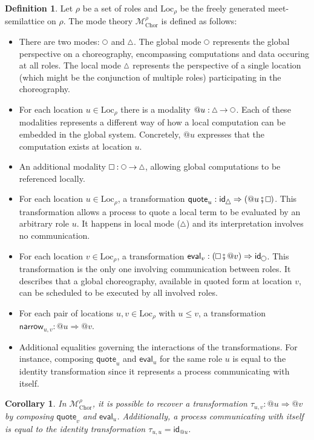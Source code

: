\documentclass{scrartcl}
\theoremstyle{definition}
\newtheorem{definition}{Definition}
\theoremstyle{plain}
\newtheorem{corollary}{Corollary}
\renewcommand{\square}%
  {\tikz{\draw (0,0) rectangle (0.2cm,0.2cm);}}
\renewcommand{\circle}%
  {\tikz{\draw (0,0) circle [radius=0.1cm];}}
\renewcommand{\triangle}%
  {\tikz{\draw (0,0) -- (0.2cm,0) -- (0.1cm,0.2cm) -- (0,0);}}
\begin{document}
\begin{definition}
Let $\rho$ be a set of roles and $\textrm{Loc}_\rho$ be the freely generated
meet-semilattice on $\rho$. The mode theory $\mathcal{M}^\rho_{\textrm{Chor}}$
is defined as follows:
\begin{itemize}
\item
  There are two modes: $\circle$ and $\triangle$. The global mode $\circle$
  represents the global perspective on a choreography, encompassing
  computations and data occuring at all roles. The local mode $\triangle$
  represents the perspective of a single location (which might be the
  conjunction of multiple roles) participating in the choreography.
\item
  For each location $u \in \textrm{Loc}_\rho$ there is a modality $@u :
  \triangle \to \circle$. Each of these modalities represents a different way
  of how a local computation can be embedded in the global system. Concretely,
  $@u$ expresses that the computation exists at location $u$.
\item
  An additional modality $\square : \circle \to \triangle$, allowing global
  computations to be referenced locally.
\item
  For each location $u \in \textrm{Loc}_\rho$, a transformation
  $\textsf{quote}_u : \textsf{id}_{\triangle} \Rightarrow ({}@ u \fatsemi
  \square)$. This transformation allows a process to quote a local term to be
  evaluated by an arbitrary role $u$. It happens in local mode ($\triangle$)
  and its interpretation involves no communication.
\item
  For each location $v \in \textrm{Loc}_\rho$, a transformation
  $\textsf{eval}_v : (\square \fatsemi {}@ v) \Rightarrow
  \textsf{id}_{\circle}$. This transformation is the only one involving
  communication between roles. It describes that a global choreography,
  available in quoted form at location $v$, can be scheduled to be executed by
  all involved roles.
\item
  For each pair of locations $u, v \in \textrm{Loc}_\rho$ with $u \leq v$, a
  transformation $\textsf{narrow}_{u,v} : @u \Rightarrow @v$.
\item
  Additional equalities governing the interactions of the transformations. For
  instance, composing $\textsf{quote}_u$ and $\textsf{eval}_u$ for the same
  role $u$ is equal to the identity transformation since it represents a
  process communicating with itself.
\end{itemize}
\end{definition}
\begin{corollary}
  In {\upshape$\mathcal{M}^{\rho}_{\textrm{Chor}}$}, it is possible to recover
  a transformation $\tau_{u,v} : @u \Rightarrow @v$ by composing
  {\upshape$\textsf{quote}_v$} and {\upshape$\textsf{eval}_u$}. Additionally, a
  process communicating with itself is equal to the identity transformation
  {\upshape$\tau_{u,u} = \textsf{id}_{@u}$}.
\end{corollary}
\end{document}
